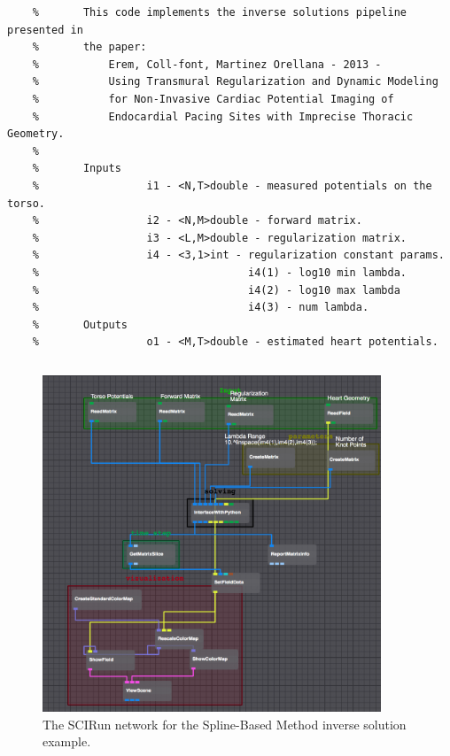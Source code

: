 
    \begin{verbatim}
    %		This code implements the inverse solutions pipeline presented in
    %		the paper:
    %	        Erem, Coll-font, Martinez Orellana - 2013 -
    %	        Using Transmural Regularization and Dynamic Modeling
    %	        for Non-Invasive Cardiac Potential Imaging of
    %	        Endocardial Pacing Sites with Imprecise Thoracic Geometry.
    %
    %		Inputs
    %				  i1 - <N,T>double - measured potentials on the torso.
    %				  i2 - <N,M>double - forward matrix.
    %				  i3 - <L,M>double - regularization matrix.
    %				  i4 - <3,1>int - regularization constant params.
    %				                  i4(1) - log10 min lambda.
    %				                  i4(2) - log10 max lambda
    %				                  i4(3) - num lambda.
    %		Outputs
    %				  o1 - <M,T>double - estimated heart potentials.
    \end{verbatim}


    \begin{verbatim}

    \end{verbatim}

    \begin{figure}
        \begin{center}
        \includegraphics[width=0.9\textwidth]{ECGToolkitGuide_figures/splineInverse_Network.png}
        \caption{The SCIRun network for the Spline-Based Method inverse solution example.}
        \label{fig:splineInverse}
        \end{center}
    \end{figure}



